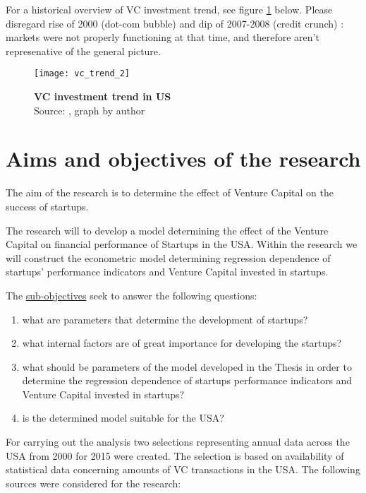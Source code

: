 For a historical overview of VC investment trend, see figure \ref{fig:vc_trend} below. Please disregard rise of 2000 (dot-com bubble) and dip of 2007-2008 (credit crunch) : markets were not properly functioning at that time, and therefore aren't represenative of the general picture.

\begin{figure}[ht]
    \centering
    \texttt{[image: vc\_trend\_2]}
    \caption{ \textbf{VC investment trend in US}\\Source: \parencite[][]{moneytree}, graph by author}
    \label{fig:vc_trend}
\end{figure}

\section{Aims and objectives of the research}
The aim of the research is to determine the effect of Venture Capital on the success of startups.

The research will to develop a model determining the effect of the Venture Capital on financial performance of Startups in the USA. Within the research we will construct the econometric model determining regression dependence of startups' performance indicators and Venture Capital invested in startups.

The \underline{sub-objectives} seek to answer the following questions:
\begin{enumerate}
    \item what are parameters that determine the development of startups?
    \item what internal factors are of great importance for developing the startups?
    \item what should be parameters of the model developed in the Thesis in order to determine the regression dependence of startups performance indicators and Venture Capital invested in startups?
    \item is the determined model suitable for the USA?
\end{enumerate}


For carrying out the analysis two selections representing annual data across the USA from 2000 for 2015 were created. The selection is based on availability of statistical data concerning amounts of VC transactions in the USA. 
The following sources were considered for the research:

